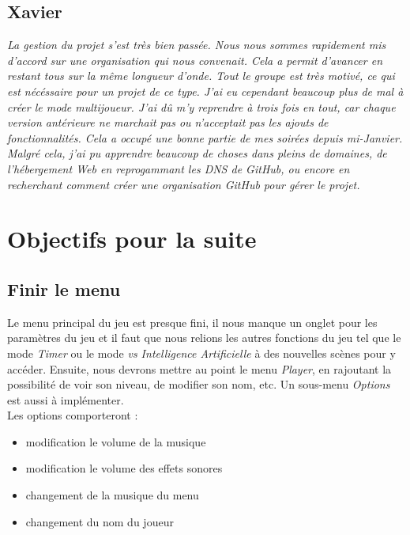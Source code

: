 \documentclass[12pt,a4paper]{article}
\newcommand{\AI}{Intelligence Artificielle}
\begin{document}
    \subsection{Xavier}
        \textit{La gestion du projet s'est très bien passée. Nous nous sommes
        rapidement mis d'accord sur une organisation qui nous convenait. Cela a
        permit d'avancer en restant tous sur la même longueur d'onde. Tout le
        groupe est très motivé, ce qui est nécéssaire pour un projet de ce type.
        J'ai eu cependant beaucoup plus de mal à créer le mode multijoueur. J'ai
        dû m'y reprendre à trois fois en tout, car chaque version antérieure
        ne marchait pas ou n'acceptait pas les ajouts de fonctionnalités. Cela a
        occupé une bonne partie de mes soirées depuis mi-Janvier. Malgré cela, 
        j'ai pu apprendre beaucoup de choses dans pleins de domaines, de
        l'hébergement Web en reprogammant les \textit{DNS} de \textsl{GitHub}, 
        ou encore en recherchant comment créer une organisation \textsl{GitHub} 
        pour gérer le projet.}\\[1cm]


\section{Objectifs pour la suite}
    \subsection{Finir le menu}
        Le menu principal du jeu est presque fini, il nous manque un onglet 
        pour les paramètres du jeu et il faut que nous relions les autres
        fonctions du jeu tel que le mode \textit{Timer} ou le mode \textit{vs \AI}
        à des nouvelles scènes pour y accéder. Ensuite, nous devrons mettre 
        au point le menu \textit{Player}, en rajoutant la possibilité de 
        voir son niveau, de modifier son nom, etc. Un sous-menu \textit{Options}
        est aussi à implémenter.\\
        Les options comporteront :
        \begin{itemize}
            \item modification le volume de la musique
            \item modification le volume des effets sonores
            \item changement de la musique du menu
            \item changement du nom du joueur
        \end{itemize}
\end{document}
